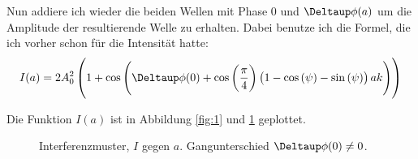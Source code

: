 Nun addiere ich wieder die beiden Wellen mit Phase $0$ und $\Deltaup \phi(a)$ um die Amplitude der resultierende Welle zu erhalten. Dabei benutze ich die Formel, die ich vorher schon für die Intensität hatte:
\[
	I(a) = 2 A_0^2 \del{1 + \cos\del{\Deltaup \phi(0) + \cos\del{\frac \pi 4} \del{1 - \cos\del\psi - \sin\del\psi} ak}}
\]

Die Funktion $I(a)$ ist in Abbildung \ref{fig:1} und \ref{fig:2} geplottet.

\begin{figure}
	\centering
	\begin{minipage}[t]{0.43\linewidth}
	\centering
	\caption{%
		Interferenzmuster, $I$ gegen $a$. Es ist ein bestimmter
		Verkippungswinkel $\psi$ ist eingestellt, der Gangunterschied $\Deltaup
		\phi(0)$ ist gleich $0$.
	}
	\label{fig:1}
	\end{minipage}
	\hspace{0.12\linewidth}
	\begin{minipage}[t]{0.43\linewidth}
	\centering
	\caption{%
		Interferenzmuster, $I$ gegen $a$. Gangunterschied $\Deltaup \phi(0)
		\neq 0$.
	}
	\label{fig:2}
	\end{minipage}
\end{figure}






